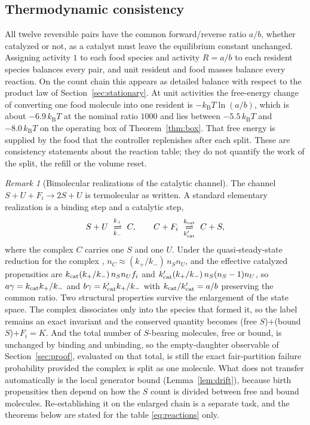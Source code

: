 \documentclass[11pt,a4paper]{article}
\theoremstyle{plain}
\theoremstyle{definition}
\theoremstyle{remark}
\newtheorem{remark}[theorem]{Remark}
\newcommand{\kB}{k_{\mathrm B}}
\begin{document}
\subsection{Thermodynamic consistency}\label{sec:thermo}
All twelve reversible pairs have the common forward/reverse ratio $a/b$, whether catalyzed or not, as a catalyst must leave the equilibrium constant unchanged. Assigning activity $1$ to each food species and activity $R=a/b$ to each resident species balances every pair, and unit resident and food masses balance every reaction. On the count chain this appears as detailed balance with respect to the product law of Section~\ref{sec:stationary}. At unit activities the free-energy change of converting one food molecule into one resident is $-\kB T\ln(a/b)$, which is about $-6.9\,\kB T$ at the nominal ratio $1000$ and lies between $-5.5\,\kB T$ and $-8.0\,\kB T$ on the operating box of Theorem~\ref{thm:box}. That free energy is supplied by the food that the controller replenishes after each split. These are consistency statements about the reaction table; they do not quantify the work of the split, the refill or the volume reset.

\begin{remark}[Bimolecular realizations of the catalytic channel]\label{rem:bimolecular}
The channel $S+U+F_i\to2S+U$ is termolecular as written. A standard elementary realization is a binding step and a catalytic step,
\[
 S+U\ \underset{k_-}{\overset{k_+}{\rightleftharpoons}}\ C,\qquad
 C+F_i\ \underset{k'_{\rm cat}}{\overset{k_{\rm cat}}{\rightleftharpoons}}\ C+S ,
\]
where the complex $C$ carries one $S$ and one $U$. Under the quasi-steady-state reduction for the complex \citep{briggshaldane1925,segelslemrod1989,raoarkin2003}, $n_C\approx(k_+/k_-)\,n_Sn_U$, and the effective catalyzed propensities are $k_{\rm cat}(k_+/k_-)\,n_Sn_Uf_i$ and $k'_{\rm cat}(k_+/k_-)\,n_S(n_S-1)n_U$, so $a\gamma=k_{\rm cat}k_+/k_-$ and $b\gamma=k'_{\rm cat}k_+/k_-$ with $k_{\rm cat}/k'_{\rm cat}=a/b$ preserving the common ratio. Two structural properties survive the enlargement of the state space. The complex dissociates only into the species that formed it, so the label remains an exact invariant and the conserved quantity becomes (free $S$)$+$(bound $S$)$+F_i=K$. And the total number of $S$-bearing molecules, free or bound, is unchanged by binding and unbinding, so the empty-daughter observable of Section~\ref{sec:proof}, evaluated on that total, is still the exact fair-partition failure probability provided the complex is split as one molecule. What does not transfer automatically is the local generator bound (Lemma~\ref{lem:drift}), because birth propensities then depend on how the $S$ count is divided between free and bound molecules. Re-establishing it on the enlarged chain is a separate task, and the theorems below are stated for the table \eqref{eq:reactions} only.
\end{remark}
\end{document}
